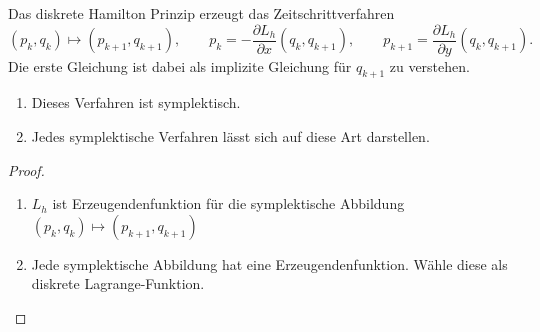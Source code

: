 \begin{satz}
	Das diskrete Hamilton Prinzip erzeugt das Zeitschrittverfahren
	\begin{equation*}
		(p_k, q_k) \mapsto (p_{k+1}, q_{k+1}),
		\qquad
		p_k = - \frac{\partial L_h}{\partial x} (q_k, q_{k+1}),
		\qquad
		p_{k+1}  = \frac{\partial L_h}{\partial y} (q_k, q_{k+1}).
	\end{equation*}
	Die erste Gleichung ist dabei als implizite Gleichung für $q_{k+1}$ zu verstehen.
	\begin{enumerate}[label=(\roman*)]
		\item Dieses Verfahren ist symplektisch.
		\item Jedes symplektische Verfahren lässt sich auf diese Art darstellen.
	\end{enumerate}
\end{satz}
\begin{proof}\mbox{} %
	\begin{enumerate}[label=(\roman*)]
		\item $L_h$ ist Erzeugendenfunktion für die symplektische Abbildung $(p_k, q_k) \mapsto (p_{k+1}, q_{k+1})$
		\item Jede symplektische Abbildung hat eine Erzeugendenfunktion. Wähle diese als diskrete Lagrange-Funktion.
	\end{enumerate}
\end{proof}

